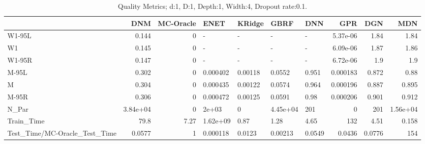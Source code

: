 \begin{table}
\centering
\caption{Quality Metrics; d:1, D:1, Depth:1, Width:4, Dropout rate:0.1.}
\begin{tabular}{lrrllllrrr}
\toprule
{} &      DNM &  MC-Oracle &     ENET &  KRidge &     GBRF &    DNN &      GPR &    DGN &      MDN \\
\midrule
W1-95L                        &    0.144 &          0 &        - &       - &        - &      - & 5.37e-06 &   1.84 &     1.84 \\
W1                            &    0.145 &          0 &        - &       - &        - &      - & 6.09e-06 &   1.87 &     1.86 \\
W1-95R                        &    0.147 &          0 &        - &       - &        - &      - & 6.72e-06 &    1.9 &      1.9 \\
M-95L                         &    0.302 &          0 & 0.000402 & 0.00118 &   0.0552 &  0.951 & 0.000183 &  0.872 &     0.88 \\
M                             &    0.304 &          0 & 0.000435 & 0.00122 &   0.0574 &  0.964 & 0.000196 &  0.887 &    0.895 \\
M-95R                         &    0.306 &          0 & 0.000472 & 0.00125 &   0.0591 &   0.98 & 0.000206 &  0.901 &    0.912 \\
N\_Par                         & 3.84e+04 &          0 &    2e+03 &       0 & 4.45e+04 &    201 &        0 &    201 & 1.56e+04 \\
Train\_Time                    &     79.8 &       7.27 & 1.62e+09 &    0.87 &     1.28 &   4.65 &      132 &   4.51 &    0.158 \\
Test\_Time/MC-Oracle\_Test\_Time &   0.0577 &          1 & 0.000118 &  0.0123 &  0.00213 & 0.0549 &   0.0436 & 0.0776 &      154 \\
\bottomrule
\end{tabular}
\end{table}
